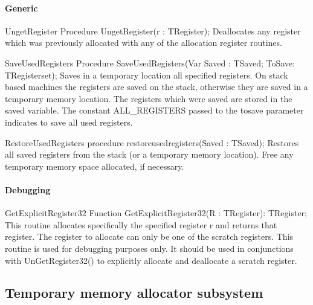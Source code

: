 \documentclass [a4paper,12pt]{article}
\begin{document}
\paragraph{Generic}

\begin{procedure}{UngetRegister}
\Declaration
Procedure UngetRegister(r : TRegister);
\Description
Deallocates any register which was previously allocated with any of the
allocation register routines.
\end{procedure}

\begin{function}{SaveUsedRegisters}
\Declaration
Procedure SaveUsedRegisters(Var Saved : TSaved; ToSave: TRegisterset);
\Description
Saves in a temporary location all specified registers. On stack based
machines the registers are saved on the stack, otherwise they are saved in a
temporary memory location. The registers which were saved are stored in the
\textsf{saved} variable. The constant \textsf{ALL{\_}REGISTERS} passed to
the \textsf{tosave} parameter indicates to save all used registers.
\end{function}

\begin{function}{RestoreUsedRegisters}
\Declaration
procedure restoreusedregisters(Saved : TSaved);
\Description
Restores all saved registers from the stack (or a temporary memory
location). Free any temporary memory space allocated, if necessary.
\end{function}

\paragraph{Debugging}

\begin{function}{GetExplicitRegister32}
\Declaration
Function GetExplicitRegister32(R : TRegister): TRegister;
\Description
This routine allocates specifically the specified register \textsf{r} and
returns that register. The register to allocate can only be one of the
scratch registers.
\Notes
This routine is used for debugging purposes only. It should be used in
conjunctions with UnGetRegister32() to explicitly allocate and deallocate a
scratch register.
\end{function}

\subsection{Temporary memory allocator subsystem}
\label{subsec:temporary}
\end{document}
